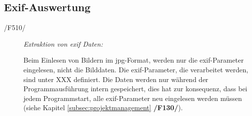 \subsection{Exif-Auswertung}

	\begin{description}

		\item[/F510/] \textit{Extraktion von \gls{exif} Daten:}\par Beim Einlesen von Bildern im \gls{jpg}-Format, werden nur die \gls{exif}-Parameter eingelesen, nicht die Bilddaten. Die \gls{exif}-Parameter, die verarbeitet werden, sind unter XXX definiert. Die Daten werden nur während der Programmausführung intern gespeichert, dies hat zur konsequenz, dass bei jedem Programmstart, alle \gls{exif}-Parameter neu eingelesen werden müssen (siehe Kapitel \ref{subsec:projektmanagement} \textbf{/F130/}).
	
	\end{description}